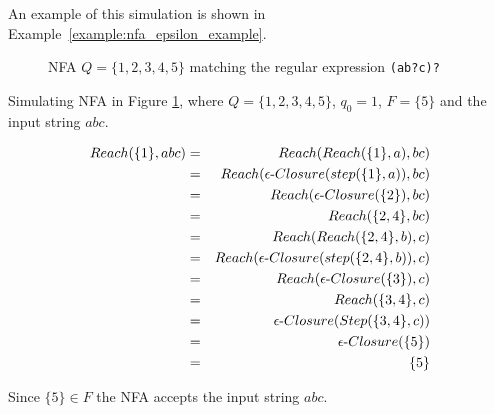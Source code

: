\documentclass[12pt]{article}
\theoremstyle{definition}
\begin{document}
An example of this simulation is shown in Example~\ref{example:nfa_epsilon_example}.

\begin{figure}[H]
  \begin{center}

	
	\caption{NFA $Q = \{1, 2, 3, 4, 5\}$ matching the regular expression \texttt{(ab?c)?}}
	\label{nfa_epsilon}
  \end{center}
\end{figure}

\begin{example}
\label{example:nfa_epsilon_example}
Simulating NFA in Figure \ref{nfa_epsilon}, where $Q = \{1, 2, 3, 4, 5\}$, $q_0 = 1$, $F = \{5\}$ and the input string $abc$.

\begin{eqnarray}
Reach(\{1\}, abc) &=& Reach(Reach(\{1\}, a), bc) \notag \\
&=& Reach(\epsilon\text{-}Closure(step(\{1\}, a)), bc) \notag \\
&=& Reach(\epsilon\text{-}Closure(\{2\}), bc) \notag \\
&=& Reach(\{2,4\}, bc) \notag \\
&=& Reach(Reach(\{2,4\}, b), c) \notag \\
&=& Reach(\epsilon\text{-}Closure(step(\{2,4\}, b)), c) \notag \\
&=& Reach(\epsilon\text{-}Closure(\{3\}), c) \notag \\
&=& Reach(\{3,4\}, c) \notag \\
&=& \epsilon\text{-}Closure(Step(\{3,4\}, c)) \notag \\
&=& \epsilon\text{-}Closure(\{5\}) \notag \\
&=& \{5\} \notag 
\end{eqnarray}

Since $\{5\} \in F$ the NFA accepts the input string $abc$.
\end{example}
\end{document}

